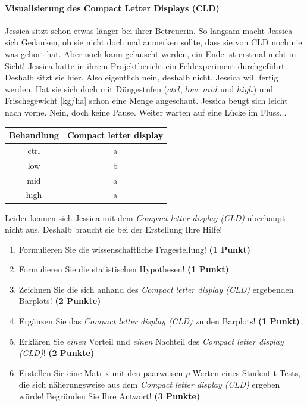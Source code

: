 \documentclass[a4paper, 9pt]{scrartcl}\usepackage[]{graphicx}\usepackage[]{xcolor}
\newenvironment{knitrout}{}{} %
\begin{document}
\paragraph{Visualisierung des Compact Letter Displays (CLD)}

Jessica sitzt schon etwas länger bei ihrer Betreuerin. So langsam macht Jessica sich Gedanken, ob sie nicht doch mal anmerken sollte, dass sie von CLD noch nie was gehört hat. Aber noch kann gelauscht werden, ein Ende ist erstmal nicht in Sicht! Jessica hatte in ihrem Projektbericht ein Feldexperiment durchgeführt. Deshalb sitzt sie hier. Also eigentlich nein, deshalb nicht. Jessica will fertig werden. Hat sie sich doch mit Düngestufen ($ctrl$, $low$, $mid$ und $high$) und Frischegewicht [kg/ha] schon eine Menge angeschaut. Jessica beugt sich leicht nach vorne. Nein, doch keine Pause. Weiter warten auf eine Lücke im Fluss...

\begin{knitrout}
\color{fgcolor}\begin{table}[!h]
\centering\begingroup\fontsize{10}{12}\selectfont

\begin{tabular}{cc}
\toprule
\textbf{Behandlung} & \textbf{Compact letter display}\\
\midrule
ctrl & a\\
low & b\\
mid & a\\
high & a\\
\bottomrule
\end{tabular}
\endgroup{}
\end{table}

\end{knitrout}

Leider kennen sich Jessica mit dem \textit{Compact letter display (CLD)} überhaupt nicht aus. Deshalb braucht sie bei der Erstellung Ihre Hilfe!

\begin{enumerate}
  \item Formulieren Sie die wissenschaftliche Fragestellung! \textbf{(1 Punkt)}
  \item Formulieren Sie die statistischen Hypothesen! \textbf{(1 Punkt)}
\item Zeichnen Sie die sich anhand des \textit{Compact letter display (CLD)} ergebenden Barplots! \textbf{(2 Punkte)}
\item Ergänzen Sie das \textit{Compact letter display (CLD)} zu den Barplots! \textbf{(1 Punkt)}
\item Erklären Sie \textit{einen} Vorteil und \textit{einen} Nachteil des \textit{Compact letter display (CLD)}! \textbf{(2 Punkte)}
\item Erstellen Sie eine Matrix mit den paarweisen $p$-Werten eines Student t-Tests, die sich näherungsweise aus dem \textit{Compact letter display (CLD)} ergeben würde! Begründen Sie Ihre Antwort! \textbf{(3 Punkte)}
\end{enumerate}
\end{document}
